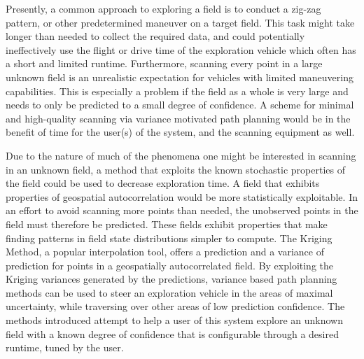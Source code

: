 Presently, a common approach to exploring a field is to conduct a zig-zag pattern, or other predetermined maneuver on a target field. This task might take longer than needed to collect the required data, and could potentially ineffectively use the flight or drive time of the exploration vehicle which often has a short and limited runtime. Furthermore, scanning every point in a large unknown field is an unrealistic expectation for vehicles with limited maneuvering capabilities. This is especially a problem if the field as a whole is very large and needs to only be predicted to a small degree of confidence. A scheme for minimal and high-quality scanning via variance motivated path planning would be in the benefit of time for the user(s) of the system, and the scanning equipment as well.

Due to the nature of much of the phenomena one might be interested in scanning in an unknown field, a method that exploits the known stochastic properties of the field could be used to decrease exploration time. A field that exhibits properties of geospatial autocorrelation would be more statistically exploitable. In an effort to avoid scanning more points than needed, the unobserved points in the field must therefore be predicted. These fields exhibit properties that make finding patterns in field state distributions simpler to compute. The Kriging Method, a popular interpolation tool, offers a prediction and a variance of prediction for points in a geospatially autocorrelated field. By exploiting the Kriging variances generated by the predictions, variance based path planning methods can be used to steer an exploration vehicle in the areas of maximal uncertainty, while traversing over other areas of low prediction confidence. The methods introduced attempt to help a user of this system explore an unknown field with a known degree of confidence that is configurable through a desired runtime, tuned by the user.

